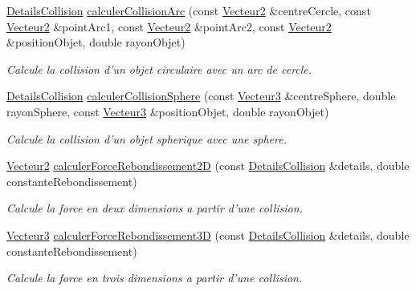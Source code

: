 \begin{DoxyCompactItemize}
\hyperlink{classaidecollision_1_1_details_collision}{Details\-Collision} \hyperlink{namespaceaidecollision_abd98f8eab0ec2b1370fecaf55b9dcf55}{calculer\-Collision\-Arc} (const \hyperlink{group__utilitaire_ga6f7808e68c967b90bd7e737b7e1b78de}{Vecteur2} \&centre\-Cercle, const \hyperlink{group__utilitaire_ga6f7808e68c967b90bd7e737b7e1b78de}{Vecteur2} \&point\-Arc1, const \hyperlink{group__utilitaire_ga6f7808e68c967b90bd7e737b7e1b78de}{Vecteur2} \&point\-Arc2, const \hyperlink{group__utilitaire_ga6f7808e68c967b90bd7e737b7e1b78de}{Vecteur2} \&position\-Objet, double rayon\-Objet)
\begin{DoxyCompactList}\small\item\em Calcule la collision d'un objet circulaire avec un arc de cercle. \end{DoxyCompactList}\item 
\hyperlink{classaidecollision_1_1_details_collision}{Details\-Collision} \hyperlink{namespaceaidecollision_ab4172fb76b2ff4925328f52459a134ab}{calculer\-Collision\-Sphere} (const \hyperlink{group__utilitaire_ga541aa4837ad9250d3a248dc82ee9ad4d}{Vecteur3} \&centre\-Sphere, double rayon\-Sphere, const \hyperlink{group__utilitaire_ga541aa4837ad9250d3a248dc82ee9ad4d}{Vecteur3} \&position\-Objet, double rayon\-Objet)
\begin{DoxyCompactList}\small\item\em Calcule la collision d'un objet spherique avec une sphere. \end{DoxyCompactList}\item 
\hyperlink{group__utilitaire_ga6f7808e68c967b90bd7e737b7e1b78de}{Vecteur2} \hyperlink{namespaceaidecollision_adfb0d490d1e7e1eb0b7d34a7ecba982f}{calculer\-Force\-Rebondissement2\-D} (const \hyperlink{classaidecollision_1_1_details_collision}{Details\-Collision} \&details, double constante\-Rebondissement)
\begin{DoxyCompactList}\small\item\em Calcule la force en deux dimensions a partir d'une collision. \end{DoxyCompactList}\item 
\hyperlink{group__utilitaire_ga541aa4837ad9250d3a248dc82ee9ad4d}{Vecteur3} \hyperlink{namespaceaidecollision_aeb5fa0c355658723c12093e3c65dfca3}{calculer\-Force\-Rebondissement3\-D} (const \hyperlink{classaidecollision_1_1_details_collision}{Details\-Collision} \&details, double constante\-Rebondissement)
\begin{DoxyCompactList}\small\item\em Calcule la force en trois dimensions a partir d'une collision. \end{DoxyCompactList}\item 

\end{DoxyCompactItemize}
